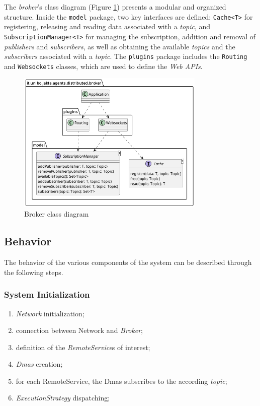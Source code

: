 The \textit{broker}'s class diagram (Figure \ref{fig:broker-class-diagram}) presents a modular and organized structure.
Inside the \texttt{model} package, two key interfaces are defined: \texttt{Cache<T>} for registering, releasing and reading data associated with a \textit{topic}, and \texttt{SubscriptionManager<T>} for managing the subscription, addition and removal of \textit{publishers} and \textit{subscribers}, as well as obtaining the available \textit{topics} and the \textit{subscribers} associated with a \textit{topic}.
The \texttt{plugins} package includes the \texttt{Routing} and \texttt{Websockets} classes, which are used to define the \textit{Web APIs}.

\begin{figure}[ht!]
    \centering
    \includegraphics[width=0.8\textwidth]{figures/broker-class-diagram.png}
    \caption{Broker class diagram}
    \label{fig:broker-class-diagram}
\end{figure}

\subsection{Behavior}
The behavior of the various components of the system can be described through the following steps.

\subsubsection{System Initialization}

\begin{enumerate}
    \item \textit{Network} initialization;
    \item connection between Network and \textit{Broker};
    \item definition of the \textit{RemoteService}s of interest;
    \item \textit{Dmas} creation;
    \item for each RemoteService, the Dmas subscribes to the according \textit{topic};
    \item \textit{ExecutionStrategy} dispatching;
\end{enumerate}

